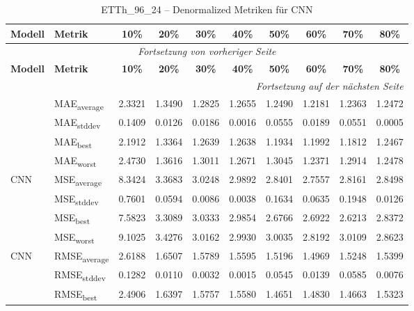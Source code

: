 {\small
\begin{longtable}{l l c c c c c c c c}
    \toprule
    \textbf{Modell} & \textbf{Metrik} & \textbf{10\%} & \textbf{20\%} & \textbf{30\%} & \textbf{40\%} & \textbf{50\%} & \textbf{60\%} & \textbf{70\%} & \textbf{80\%} \\
    \midrule
    \endfirsthead
    \multicolumn{10}{c}{\textit{Fortsetzung von vorheriger Seite}} \\
    \toprule
    \textbf{Modell} & \textbf{Metrik} & \textbf{10\%} & \textbf{20\%} & \textbf{30\%} & \textbf{40\%} & \textbf{50\%} & \textbf{60\%} & \textbf{70\%} & \textbf{80\%} \\
    \midrule
    \endhead
    \midrule
    \multicolumn{10}{r}{\textit{Fortsetzung auf der nächsten Seite}} \\
    \midrule
    \endfoot
    \bottomrule
    \caption{ETTh_96_24 -- Denormalized Metriken für CNN}
    \label{tab:etth_96_24_denormalized_cnn}
    \endlastfoot
\multirow{4}{*}{CNN} & MAE\textsubscript{average} & 2.3321 & 1.3490 & 1.2825 & 1.2655 & 1.2490 & 1.2181 & 1.2363 & 1.2472 \\
 & MAE\textsubscript{stddev} & 0.1409 & 0.0126 & 0.0186 & 0.0016 & 0.0555 & 0.0189 & 0.0551 & 0.0005 \\
 & MAE\textsubscript{best} & 2.1912 & 1.3364 & 1.2639 & 1.2638 & 1.1934 & 1.1992 & 1.1812 & 1.2467 \\
 & MAE\textsubscript{worst} & 2.4730 & 1.3616 & 1.3011 & 1.2671 & 1.3045 & 1.2371 & 1.2914 & 1.2478 \\
\cmidrule(lr){2-10}
\multirow{4}{*}{CNN} & MSE\textsubscript{average} & 8.3424 & 3.3683 & 3.0248 & 2.9892 & 2.8401 & 2.7557 & 2.8161 & 2.8498 \\
 & MSE\textsubscript{stddev} & 0.7601 & 0.0594 & 0.0086 & 0.0038 & 0.1634 & 0.0635 & 0.1948 & 0.0126 \\
 & MSE\textsubscript{best} & 7.5823 & 3.3089 & 3.0333 & 2.9854 & 2.6766 & 2.6922 & 2.6213 & 2.8372 \\
 & MSE\textsubscript{worst} & 9.1025 & 3.4276 & 3.0162 & 2.9930 & 3.0035 & 2.8192 & 3.0109 & 2.8623 \\
\cmidrule(lr){2-10}
\multirow{4}{*}{CNN} & RMSE\textsubscript{average} & 2.6188 & 1.6507 & 1.5789 & 1.5595 & 1.5196 & 1.4969 & 1.5248 & 1.5399 \\
 & RMSE\textsubscript{stddev} & 0.1282 & 0.0110 & 0.0032 & 0.0015 & 0.0545 & 0.0139 & 0.0585 & 0.0076 \\
 & RMSE\textsubscript{best} & 2.4906 & 1.6397 & 1.5757 & 1.5580 & 1.4651 & 1.4830 & 1.4663 & 1.5323 \\

\end{longtable}}
